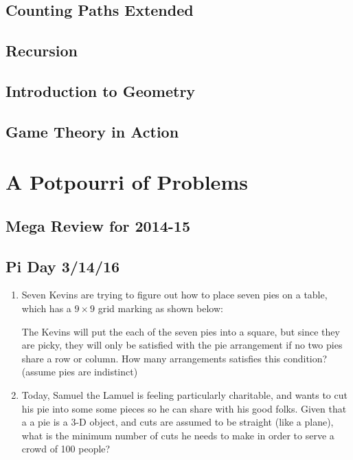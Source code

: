 \documentclass{book}
\begin{document}
\section{Counting Paths Extended}

\newpage

\section{Recursion}

\newpage

\section{Introduction to Geometry}

\newpage
\section{Game Theory in Action}

\newpage
\chapter{A Potpourri of Problems}
\section{Mega Review for 2014-15}

\newpage
\section{Pi Day 3/14/16}
\begin{enumerate}
    \item Seven Kevins are trying to figure out how to place seven pies on a table, which has a $9\times 9$ grid marking as shown below:
    \begin{center}
    \end{center}
    The Kevins will put the each of the seven pies into a square, but since they are picky, they will only be satisfied with the pie arrangement if no two pies share a row or column. How many arrangements satisfies this condition? (assume pies are indistinct)
    \item Today, Samuel the Lamuel is feeling particularly charitable, and wants to cut his pie into some some pieces so he can share with his good folks. Given that a a pie is a 3-D object, and cuts are assumed to be straight (like a plane), what is the minimum number of cuts he needs to make in order to serve a crowd of 100 people?
\end{enumerate}
\end{document}
